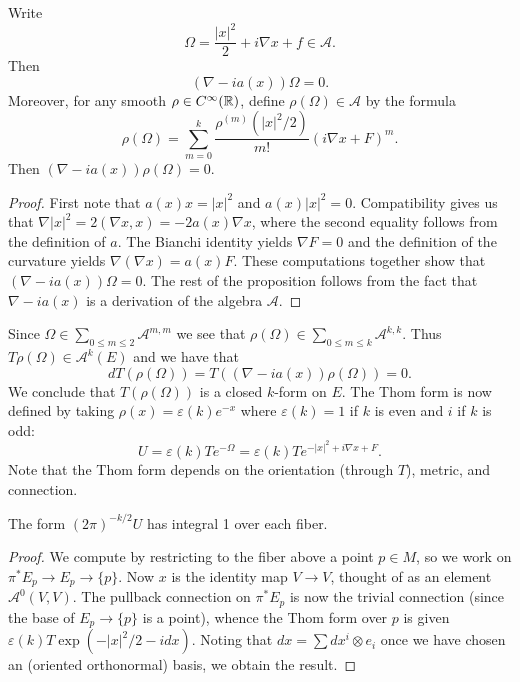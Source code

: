 \documentclass{amsart}
\begin{document}
\begin{lemma}
    Write
    \begin{equation*}
        \Omega = \frac{|x|^2}{2} + i\nabla x + f \in \mathcal{A}.
    \end{equation*}
    Then
    \begin{equation*}
        (\nabla - ia(x))\Omega = 0.
    \end{equation*}
    Moreover, for any smooth $\rho\in C^\infty(\mathbb{R})$, define $\rho(\Omega)\in \mathcal{A}$
    by the formula
    \begin{equation*}
        \rho(\Omega) = \sum_{m=0}^k \frac{\rho^{(m)}(|x|^2/2)}{m!}(i\nabla x+F)^m.
    \end{equation*}
    Then $(\nabla-ia(x))\rho(\Omega)=0$.
\end{lemma}
\begin{proof}
    First note that $a(x)x=|x|^2$ and $a(x)|x|^2=0$. Compatibility gives us that
    $\nabla |x|^2=2(\nabla x, x)=-2a(x)\nabla x$, where the second equality follows
    from the definition of $a$. The Bianchi identity yields $\nabla F=0$ and the
    definition of the curvature yields $\nabla(\nabla x)=a(x)F$. These computations
    together show that $(\nabla-ia(x))\Omega=0$. The rest of the proposition follows
    from the fact that $\nabla-ia(x)$ is a derivation of the algebra $\mathcal{A}$.
\end{proof}

Since $\Omega\in\sum_{0\leq m\leq 2}\mathcal{A}^{m,m}$ we see that
$\rho(\Omega)\in\sum_{0\leq m\leq k}\mathcal{A}^{k,k}.$ Thus $T\rho(\Omega)\in \mathcal{A}^k(E)$
and we have that
\begin{equation*}
    dT(\rho(\Omega)) = T( (\nabla-ia(x))\rho(\Omega)) = 0.
\end{equation*}
We conclude that $T(\rho(\Omega))$ is a closed $k$-form on $E$.
The Thom form is now defined by taking $\rho(x)=\varepsilon(k)e^{-x}$
where $\varepsilon(k)=1$ if $k$ is even and $i$ if $k$ is odd:
\begin{equation*}
    U = \varepsilon(k)Te^{-\Omega} = \varepsilon(k) Te^{-|x|^2+i\nabla x+F}.
\end{equation*}
Note that the Thom form depends on the orientation (through $T$), metric,
and connection.

\begin{proposition}
    The form $(2\pi)^{-k/2}U$ has integral 1 over each fiber.
\end{proposition}
\begin{proof}
    We compute by restricting to the fiber above a point $p\in M$, so we work
    on $\pi^*E_p\to E_p\to \{p\}$. Now $x$ is the identity map $V\to V$, thought
    of as an element $\mathcal{A}^0(V,V)$. The pullback connection on $\pi^*E_p$
    is now the trivial connection (since the base of $E_p\to\{p\}$ is a point),
    whence the Thom form over $p$ is given $\varepsilon(k)T\exp(-|x|^2/2-idx)$.
    Noting that $dx=\sum dx^i\otimes e_i$ once we have chosen an (oriented orthonormal)
    basis, we obtain the result.
\end{proof}
\end{document}
